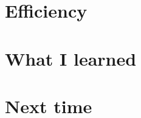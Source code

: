 \documentclass[a4paper,12pt]{article}
\begin{document}

\section{Efficiency}



\section{What I learned}


\section{Next time}

\end{document}
